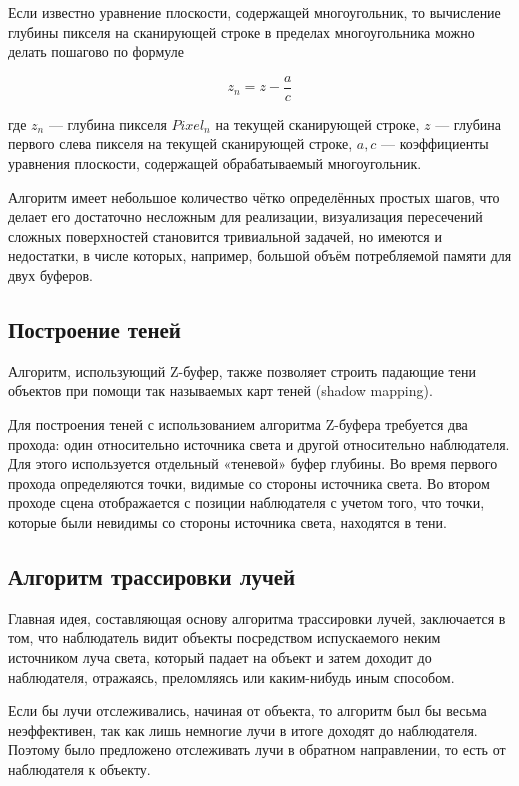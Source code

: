 \begin{enumerate}
Если известно уравнение плоскости, содержащей многоугольник, то вычисление глубины пикселя на сканирующей строке в пределах многоугольника можно делать пошагово по формуле 

\begin{equation}
z_n=z - \frac{a}{c}
\end{equation}

где $z_n$ --- глубина пикселя $Pixel_n$ на текущей сканирующей строке, $z$ --- глубина первого слева пикселя на текущей сканирующей строке, $a, c$ --- коэффициенты уравнения плоскости, содержащей обрабатываемый многоугольник.

Алгоритм имеет небольшое количество чётко определённых простых шагов, что делает его достаточно несложным для реализации, визуализация пересечений сложных поверхностей становится тривиальной задачей, но имеются и недостатки, в числе которых, например, большой объём потребляемой памяти для двух буферов.

\subsection*{Построение теней}
Алгоритм, использующий Z-буфер, также позволяет строить падающие тени объектов при помощи так называемых карт теней (shadow mapping).

Для построения теней с использованием алгоритма Z-буфера требуется два прохода: один относительно источника света и другой относительно наблюдателя. Для этого используется отдельный «теневой» буфер глубины. Во время первого прохода определяются точки, видимые со стороны источника света. Во втором проходе сцена отображается с позиции наблюдателя с учетом того, что точки, которые были невидимы со стороны источника света, находятся в тени.

\subsection{Алгоритм трассировки лучей}

Главная идея, составляющая основу алгоритма трассировки лучей, заключается в том, что наблюдатель видит объекты посредством испускаемого неким источником луча света, который падает на объект и затем доходит до наблюдателя, отражаясь, преломляясь или каким-нибудь иным способом.

Если бы лучи отслеживались, начиная от объекта, то алгоритм был бы весьма неэффективен, так как лишь немногие лучи в итоге доходят до наблюдателя. Поэтому было предложено отслеживать лучи в обратном направлении, то есть от наблюдателя к объекту.


\end{enumerate}
